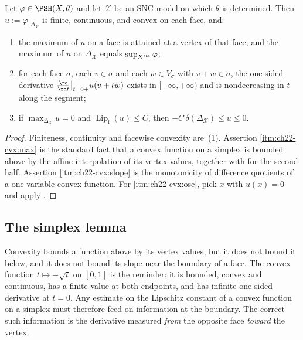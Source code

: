 \begin{lemma}
\label{lem:ch22-convexity-consequences}
Let \(\varphi\in\PSH(X,\theta)\) and let \(\mathcal X\) be an SNC model on
which \(\theta\) is determined.  Then
\(u:=\varphi|_{\Delta_{\mathcal X}}\) is finite, continuous, and convex on
each face, and:
\begin{enumerate}
\item\label{itm:ch22-cvx:max} the maximum of \(u\) on a face is attained at
a vertex of that face, and the maximum of \(u\) on
\(\Delta_{\mathcal X}\) equals \(\sup_{X^{\An}}\varphi\);
\item\label{itm:ch22-cvx:slope} for each face \(\sigma\), each
\(v\in\sigma\) and each \(w\in V_\sigma\) with \(v+w\in\sigma\), the
one-sided derivative
\(\frac{\rd}{\rd t}\big|_{t=0+}u(v+tw)\) exists in
\([-\infty,+\infty)\) and is nondecreasing in \(t\) along the segment;
\item\label{itm:ch22-cvx:osc} if \(\max_{\Delta_{\mathcal X}}u=0\) and
\(\operatorname{Lip}_{\mathrm f}(u)\leq C\), then
\(-C\,\delta(\Delta_{\mathcal X})\leq u\leq0\).
\end{enumerate}
\end{lemma}

\begin{proof}
Finiteness, continuity and facewise convexity are
\,(1).  Assertion
\cref{itm:ch22-cvx:max} is the standard fact that a convex function on a
simplex is bounded above by the affine interpolation of its vertex values,
together with  for the second half.
Assertion \cref{itm:ch22-cvx:slope} is the monotonicity of difference
quotients of a one-variable convex function.  For
\cref{itm:ch22-cvx:osc}, pick \(x\) with \(u(x)=0\) and apply
.
\end{proof}

\subsection{The simplex lemma}

Convexity bounds a function above by its vertex values, but it does not
bound it below, and it does not bound its slope near the boundary of a face.
The convex function \(t\mapsto-\sqrt t\) on \([0,1]\) is the reminder: it is
bounded, convex and continuous, has a finite value at both endpoints, and
has infinite one-sided derivative at \(t=0\).  Any estimate on the Lipschitz
constant of a convex function on a simplex must therefore feed on
information at the boundary.  The correct such information is the
derivative measured \emph{from} the opposite face \emph{toward} the vertex.

